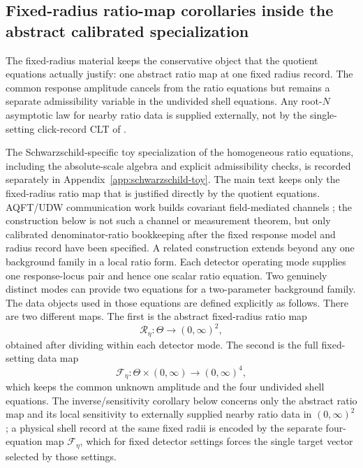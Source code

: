 \subsection{Fixed-radius ratio-map corollaries inside the abstract calibrated specialization}

The fixed-radius material keeps the conservative object that the quotient
equations actually justify: one abstract ratio map at one fixed radius record.
The common response amplitude cancels from the ratio equations but remains a
separate admissibility variable in the undivided shell equations. Any
root-$N$ asymptotic law for nearby ratio data is supplied externally, not by
the single-setting click-record CLT of .

The Schwarzschild-specific toy specialization of the homogeneous ratio
equations, including the absolute-scale algebra and explicit admissibility
checks, is recorded separately in Appendix~\ref{app:schwarzschild-toy}. The
main text keeps only the fixed-radius ratio map that is justified directly by
the quotient equations.  AQFT/UDW communication work builds covariant
field-mediated channels \cite{KasprzakTjoa2025Transmission}; the construction
below is not such a channel or measurement theorem, but only calibrated
denominator-ratio bookkeeping after the fixed response model and radius record
have been specified. A related construction extends beyond any one
background family in a local ratio form. Each
detector operating mode supplies one response-locus pair and hence one scalar ratio
equation. Two genuinely distinct modes can provide two equations for a
two-parameter background family. The data objects used in those equations are
defined explicitly as follows. There are two different maps. The first is the
abstract fixed-radius ratio map
\[
\mathcal R_\eta:\Theta\to(0,\infty)^2,
\]
obtained after dividing within each detector mode. The second is the full
fixed-setting data map
\[
\mathcal F_\eta:\Theta\times(0,\infty)\to(0,\infty)^4,
\]
which keeps the common unknown amplitude and the four undivided shell
equations. The inverse/sensitivity corollary below concerns only the abstract ratio map and
its local sensitivity to externally supplied nearby ratio data in
$(0,\infty)^2$; a physical shell record at the same fixed radii is encoded by the separate four-equation map
$\mathcal F_\eta$, which for fixed detector settings forces the single target
vector selected by those settings.

